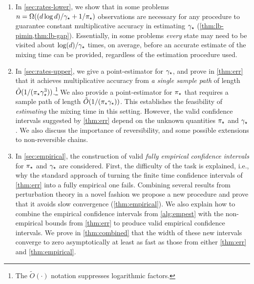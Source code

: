 \begin{enumerate}
  \item
    In \cref{sec:rates-lower}, we show that in some problems  
    $n = \Omega( (d\log d)/\gamma_{\star} + 1/\pi_{\star})$ observations are necessary for any procedure
    to guarantee constant multiplicative accuracy in estimating $\gamma_{\star}$
    (\cref{thm:lb-pimin,thm:lb-gap}).
    Essentially, in some problems \emph{every} state may need to be visited about
    $\log(d)/\gamma_{\star}$ times, on average, before an accurate estimate of
    the mixing time can be provided, regardless of the estimation
    procedure used.

  \item
    In \cref{sec:rates-upper}, we give a point-estimator for $\gamma_{\star}$,
    and prove in \cref{thm:err} that it achieves multiplicative
    accuracy from \emph{a single sample path} of length
    $\tilde{O}(1/(\pi_{\star}\gamma_{\star}^3))$.\footnote{The
    $\tilde{O}(\cdot)$ notation suppresses logarithmic factors.}
    We also provide a point-estimator for $\pi_{\star}$ that requires a sample
    path of length $\tilde{O}(1/(\pi_{\star}\gamma_{\star}))$.
    This establishes the feasibility of \emph{estimating} the mixing
    time in this setting.
    However, the valid confidence intervals suggested by
    \cref{thm:err} depend on the unknown quantities $\pi_{\star}$ and
    $\gamma_{\star}$.
    We also discuss the importance of reversibility, and some possible
    extensions to non-reversible chains.

  \item
    In \cref{sec:empirical}, the construction of
    valid \emph{fully empirical confidence intervals} for $\pi_{\star}$ and
    $\gamma_{\star}$ are considered. First, the difficulty of the task is explained,
    i.e., why the standard approach of turning the finite time confidence intervals of
    \cref{thm:err} into a fully empirical one fails.
	Combining several results from perturbation theory in a novel fashion
	we propose a new procedure and prove that it avoids slow convergence
    (\cref{thm:empirical}).
    We also explain how to combine the empirical confidence intervals
    from \cref{alg:empest} with the non-empirical bounds from
    \cref{thm:err} to produce valid empirical confidence intervals.
    We prove in \cref{thm:combined} that the width of these new
    intervals converge to zero asymptotically at least as fast as
    those from either \cref{thm:err} and \cref{thm:empirical}.



    

\end{enumerate}

